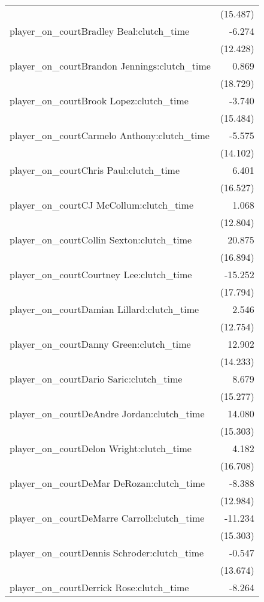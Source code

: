 \documentclass[
  landscape]{article}
\begin{document}
\begin{table}[!htbp]
\begin{tabular}{@{\extracolsep{5pt}}lD{.}{.}{-3} }
  & (15.487) \\ 
  player\_on\_courtBradley Beal:clutch\_time & -6.274 \\ 
  & (12.428) \\ 
  player\_on\_courtBrandon Jennings:clutch\_time & 0.869 \\ 
  & (18.729) \\ 
  player\_on\_courtBrook Lopez:clutch\_time & -3.740 \\ 
  & (15.484) \\ 
  player\_on\_courtCarmelo Anthony:clutch\_time & -5.575 \\ 
  & (14.102) \\ 
  player\_on\_courtChris Paul:clutch\_time & 6.401 \\ 
  & (16.527) \\ 
  player\_on\_courtCJ McCollum:clutch\_time & 1.068 \\ 
  & (12.804) \\ 
  player\_on\_courtCollin Sexton:clutch\_time & 20.875 \\ 
  & (16.894) \\ 
  player\_on\_courtCourtney Lee:clutch\_time & -15.252 \\ 
  & (17.794) \\ 
  player\_on\_courtDamian Lillard:clutch\_time & 2.546 \\ 
  & (12.754) \\ 
  player\_on\_courtDanny Green:clutch\_time & 12.902 \\ 
  & (14.233) \\ 
  player\_on\_courtDario Saric:clutch\_time & 8.679 \\ 
  & (15.277) \\ 
  player\_on\_courtDeAndre Jordan:clutch\_time & 14.080 \\ 
  & (15.303) \\ 
  player\_on\_courtDelon Wright:clutch\_time & 4.182 \\ 
  & (16.708) \\ 
  player\_on\_courtDeMar DeRozan:clutch\_time & -8.388 \\ 
  & (12.984) \\ 
  player\_on\_courtDeMarre Carroll:clutch\_time & -11.234 \\ 
  & (15.303) \\ 
  player\_on\_courtDennis Schroder:clutch\_time & -0.547 \\ 
  & (13.674) \\ 
  player\_on\_courtDerrick Rose:clutch\_time & -8.264 \\ 

\end{tabular}
\end{table}
\end{document}
